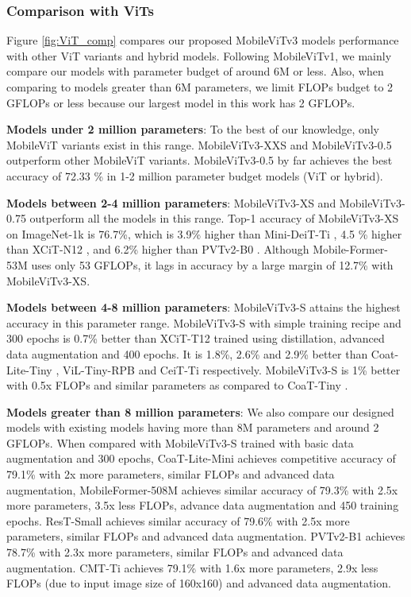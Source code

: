\documentclass{article} \usepackage{iclr2022_conference,times}
\begin{document}
\subsubsection{Comparison with ViTs}
Figure \ref{fig:ViT_comp} compares our proposed MobileViTv3 models performance with other ViT variants and hybrid models. 
Following MobileViTv1, we mainly compare our models with parameter budget of around 6M or less. 
Also, when comparing to models greater than 6M parameters, we limit FLOPs budget to 2 GFLOPs or less because our largest model in this work has 2 GFLOPs.

\textbf{Models under 2 million parameters}: 
To the best of our knowledge, only MobileViT variants exist in this range. 
MobileViTv3-XXS and MobileViTv3-0.5 outperform other MobileViT variants. 
MobileViTv3-0.5 by far achieves the best accuracy of 72.33 \%  in 1-2 million parameter budget models (ViT or hybrid). 

\textbf{Models between 2-4 million parameters}: MobileViTv3-XS and MobileViTv3-0.75 outperform all the models in this range. 
Top-1 accuracy of MobileViTv3-XS on ImageNet-1k is 76.7\%, which is 3.9\% higher than Mini-DeiT-Ti \citep{zhang2022minivit}, 4.5 \% higher than XCiT-N12 \citep{ali2021xcit}, and 6.2\% higher than PVTv2-B0 \citep{wang2022pvt}. Although Mobile-Former-53M \citep{chen2022mobile} uses only 53 GFLOPs, it lags in accuracy by a large margin of 12.7\% with MobileViTv3-XS. 

\textbf{Models between 4-8 million parameters}: 
MobileViTv3-S attains the highest accuracy in this parameter range.
MobileViTv3-S with simple training recipe and 300 epochs is 0.7\% better than XCiT-T12 trained using distillation, advanced data augmentation and 400 epochs. 
It is 1.8\%, 2.6\% and 2.9\% better than Coat-Lite-Tiny \citep{xu2021co}, ViL-Tiny-RPB \citep{zhang2021multi} and CeiT-Ti \citep{yuan2021incorporating} respectively. 
MobileViTv3-S is 1\%  better with 0.5x FLOPs and similar parameters as compared to CoaT-Tiny \citep{xu2021co}. 

\textbf{Models greater than 8 million parameters}: We also compare our designed models with existing models having more than 8M parameters and around 2 GFLOPs. 
When compared with MobileViTv3-S trained with basic data augmentation and 300 epochs, CoaT-Lite-Mini achieves competitive accuracy of 79.1\% with 2x more parameters, similar FLOPs and advanced data augmentation, MobileFormer-508M achieves similar accuracy of 79.3\% with 2.5x more parameters, 3.5x less FLOPs, advance data augmentation and 450 training epochs. 
ResT-Small \citep{zhang2021rest} achieves similar accuracy of 79.6\% with 2.5x more parameters, similar FLOPs and advanced data augmentation. PVTv2-B1 \citep{wang2022pvt} achieves 78.7\% with 2.3x more parameters, similar FLOPs and advanced data augmentation. CMT-Ti \citep{guo2022cmt}  achieves 79.1\% with 1.6x more parameters, 2.9x less FLOPs (due to input image size of 160x160) and advanced data augmentation.
\end{document}

